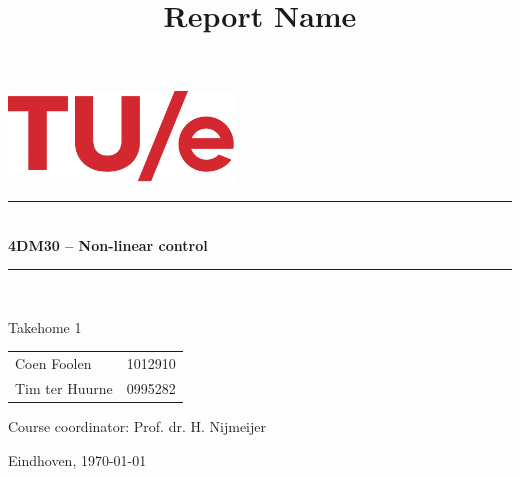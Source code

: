\documentclass[a4paper,1cm]{article}
\title{Report Name}
\newcommand{\HRule}{\rule{\linewidth}{0.5mm}}
\numberwithin{equation}{section}
\numberwithin{figure}{section}
\numberwithin{table}{section}
\begin{document}
\begin{titlepage}
\begin{center} 


\includegraphics[width=6cm]{TUelogo.png}\\


\vspace*{2cm}
\HRule \\[0.4cm] { \Large \bfseries 4DM30 – Non-linear control}\\[0.3cm] \HRule \\[1.5cm]

\vspace*{1cm}

\begin{center}
{\huge Takehome 1}\\
\end{center}

\vspace*{2cm}

\begin{minipage}{\textwidth}\large
\begin{center}
\begin{tabular}{l r}
    Coen Foolen & 1012910\\
    Tim ter Huurne & 0995282\\
\end{tabular}
\end{center}
\vspace{5mm}
\begin{center}
\vspace{5mm}
Course coordinator: Prof. dr. H. Nijmeijer \\  
\end{center}
\end{minipage}

\vfill
\large
Eindhoven, \today\\
\end{center}
\end{titlepage}
\endcenter
{}
\newpage

\tableofcontents


\newpage






\begin{appendices}

\end{appendices}


%
%
\end{document}
